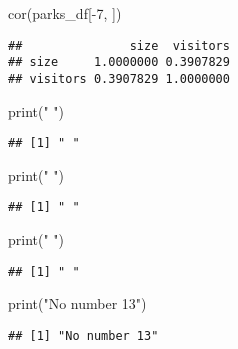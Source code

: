 \documentclass[
]{article}
\newenvironment{Shaded}{\begin{snugshade}}{\end{snugshade}}
\newcommand{\DecValTok}[1]{\textcolor[rgb]{0.00,0.00,0.81}{#1}}
\newcommand{\FunctionTok}[1]{\textcolor[rgb]{0.00,0.00,0.00}{#1}}
\newcommand{\NormalTok}[1]{#1}
\newcommand{\SpecialCharTok}[1]{\textcolor[rgb]{0.00,0.00,0.00}{#1}}
\newcommand{\StringTok}[1]{\textcolor[rgb]{0.31,0.60,0.02}{#1}}
\begin{document}
\begin{Shaded}
\begin{Highlighting}[]
\FunctionTok{cor}\NormalTok{(parks\_df[}\SpecialCharTok{{-}}\DecValTok{7}\NormalTok{, ])}
\end{Highlighting}
\end{Shaded}

\begin{verbatim}
##               size  visitors
## size     1.0000000 0.3907829
## visitors 0.3907829 1.0000000
\end{verbatim}

\begin{Shaded}
\begin{Highlighting}[]
\FunctionTok{print}\NormalTok{(}\StringTok{" "}\NormalTok{)}
\end{Highlighting}
\end{Shaded}

\begin{verbatim}
## [1] " "
\end{verbatim}

\begin{Shaded}
\begin{Highlighting}[]
\FunctionTok{print}\NormalTok{(}\StringTok{" "}\NormalTok{)}
\end{Highlighting}
\end{Shaded}

\begin{verbatim}
## [1] " "
\end{verbatim}

\begin{Shaded}
\begin{Highlighting}[]
\FunctionTok{print}\NormalTok{(}\StringTok{" "}\NormalTok{)}
\end{Highlighting}
\end{Shaded}

\begin{verbatim}
## [1] " "
\end{verbatim}

\begin{Shaded}
\begin{Highlighting}[]
\FunctionTok{print}\NormalTok{(}\StringTok{"No number 13"}\NormalTok{)}
\end{Highlighting}
\end{Shaded}

\begin{verbatim}
## [1] "No number 13"
\end{verbatim}
\end{document}
